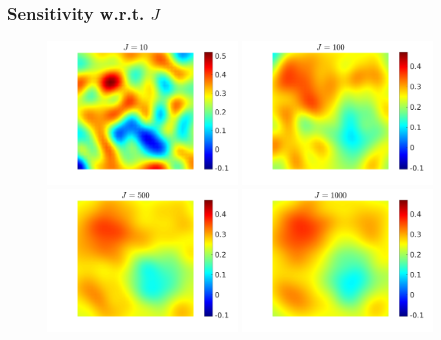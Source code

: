 \begin{frame}
\frametitle{Sensitivity w.r.t. $J$}
\begin{figure}[t]
\centering
\includegraphics[width = 0.45\textwidth]{Images/ensemble_500_J10}
\includegraphics[width = 0.45\textwidth]{Images/ensemble_500_J100}
\\
\includegraphics[width = 0.45\textwidth]{Images/ensemble_500_J500}
\includegraphics[width = 0.45\textwidth]{Images/ensemble_500_J1000}
\end{figure}
\end{frame}

